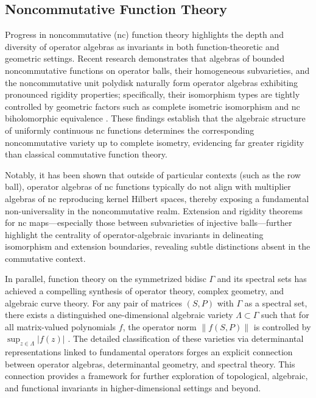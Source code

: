 \documentclass[sigconf]{acmart}
\begin{document}
\subsection{Noncommutative Function Theory}

Progress in noncommutative (nc) function theory highlights the depth and diversity of operator algebras as invariants in both function-theoretic and geometric settings. Recent research demonstrates that algebras of bounded noncommutative functions on operator balls, their homogeneous subvarieties, and the noncommutative unit polydisk naturally form operator algebras exhibiting pronounced rigidity properties; specifically, their isomorphism types are tightly controlled by geometric factors such as complete isometric isomorphism and nc biholomorphic equivalence \cite{ref98}. These findings establish that the algebraic structure of uniformly continuous nc functions determines the corresponding noncommutative variety up to complete isometry, evidencing far greater rigidity than classical commutative function theory.

Notably, it has been shown that outside of particular contexts (such as the row ball), operator algebras of nc functions typically do not align with multiplier algebras of nc reproducing kernel Hilbert spaces, thereby exposing a fundamental non-universality in the noncommutative realm. Extension and rigidity theorems for nc maps---especially those between subvarieties of injective balls---further highlight the centrality of operator-algebraic invariants in delineating isomorphism and extension boundaries, revealing subtle distinctions absent in the commutative context.

In parallel, function theory on the symmetrized bidisc $\Gamma$ and its spectral sets has achieved a compelling synthesis of operator theory, complex geometry, and algebraic curve theory. For any pair of matrices $(S, P)$ with $\Gamma$ as a spectral set, there exists a distinguished one-dimensional algebraic variety $\Lambda \subset \Gamma$ such that for all matrix-valued polynomials $f$, the operator norm $\|f(S,P)\|$ is controlled by $\sup_{z \in \Lambda} |f(z)|$ \cite{ref99}. The detailed classification of these varieties via determinantal representations linked to fundamental operators forges an explicit connection between operator algebras, determinantal geometry, and spectral theory. This connection provides a framework for further exploration of topological, algebraic, and functional invariants in higher-dimensional settings and beyond.
\end{document}
